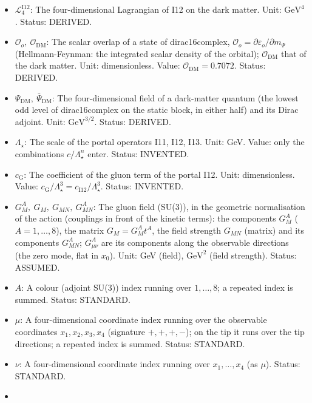 \documentclass[
  10pt,
]{article}
\providecommand{\tightlist}{%
  \setlength{\itemsep}{0pt}\setlength{\parskip}{0pt}}
\begin{document}
\begin{itemize}
\tightlist
\item
  \(\mathcal{L}_4^{\mathrm{I12}}\): The four-dimensional Lagrangian of
  I12 on the dark matter. Unit: \(\mathrm{GeV}^{4}\). Status: DERIVED.
\item
  \(\mathcal{O}_o,\ \mathcal{O}_{\mathrm{DM}}\): The scalar overlap of a
  state of dirac16complex,
  \(\mathcal{O}_o = \partial\varepsilon_o/\partial m_\Psi\)
  (Hellmann-Feynman: the integrated scalar density of the orbital);
  \(\mathcal{O}_{\mathrm{DM}}\) that of the dark matter. Unit:
  dimensionless. Value: \(\mathcal{O}_{\mathrm{DM}} = 0.7072\). Status:
  DERIVED.
\item
  \(\Psi_{\mathrm{DM}},\ \bar\Psi_{\mathrm{DM}}\): The four-dimensional
  field of a dark-matter quantum (the lowest odd level of dirac16complex
  on the static block, in either half) and its Dirac adjoint. Unit:
  \(\mathrm{GeV}^{3/2}\). Status: DERIVED.
\item
  \(\Lambda_\star\): The scale of the portal operators I11, I12, I13.
  Unit: GeV. Value: only the combinations \(c/\Lambda_\star^n\) enter.
  Status: INVENTED.
\item
  \(c_{\mathrm{G}}\): The coefficient of the gluon term of the portal
  I12. Unit: dimensionless. Value:
  \(c_{\mathrm{G}}/\Lambda_\star^3 = c_{\mathrm{I12}}/\Lambda_\star^3\).
  Status: INVENTED.
\item
  \(G^A_M,\ G_M,\ G_{MN},\ G^A_{MN}\): The gluon field (SU(3)), in the
  geometric normalisation of the action (couplings in front of the
  kinetic terms): the components \(G^A_M\) (\(A = 1, \dots, 8\)), the
  matrix \(G_M = G^A_Mt^A\), the field strength \(G_{MN}\) (matrix) and
  its components \(G^A_{MN}\); \(G^A_{\mu\nu}\) are its components along
  the observable directions (the zero mode, flat in \(x_0\)). Unit: GeV
  (field), \(\mathrm{GeV}^{2}\) (field strength). Status: ASSUMED.
\item
  \(A\): A colour (adjoint SU(3)) index running over \(1, \dots, 8\); a
  repeated index is summed. Status: STANDARD.
\item
  \(\mu\): A four-dimensional coordinate index running over the
  observable coordinates \(x_1, x_2, x_3, x_4\) (signature \(+,+,+,-\));
  on the tip it runs over the tip directions; a repeated index is
  summed. Status: STANDARD.
\item
  \(\nu\): A four-dimensional coordinate index running over
  \(x_1, \dots, x_4\) (as \(\mu\)). Status: STANDARD.
\item

\end{itemize}
\end{document}
